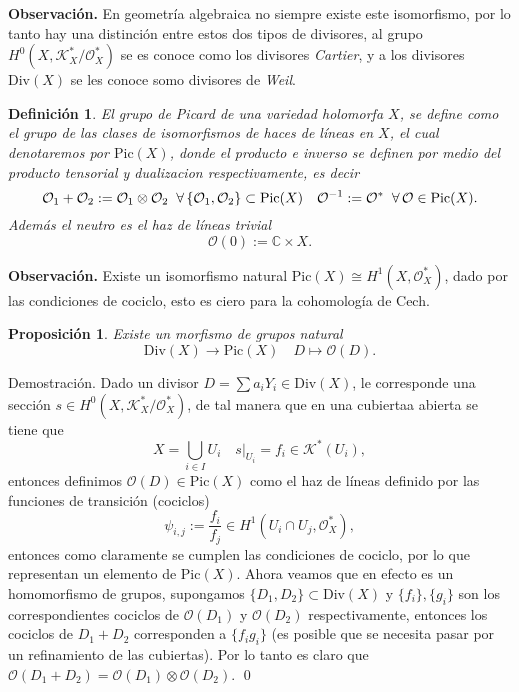 \documentclass[letterpaper]{article}
\newtheorem{prop}[teorema]{Proposici\'on}
\newtheorem{def.}{Definici\'on}[section]
\newcommand{\obs}{{\noindent \sc \textbf{Observación. }}}
\newcommand{\dem}{{\noindent \sc Demostraci\'on. }}
\newcommand{\co}{\ensuremath{\mathbb C }}
\newcommand{\lnb}{\ensuremath{\mathcal{O}}}
\newcommand{\Div}{\ensuremath{\mathrm{Div}}}
\begin{document}
\obs En geometría algebraica no siempre existe este isomorfismo, por lo tanto hay una distinción entre estos dos tipos de divisores, al grupo \(H^{0}(X,\mathcal{K}^{*}_{X}/\mathcal{O}^{*}_{X})\) se es conoce como los divisores \emph{Cartier}, y a los divisores \(\Div(X)\) se les conoce somo divisores de \emph{Weil}.
\begin{def.}
  El grupo de Picard de una variedad holomorfa \(X\), se define como el grupo de las clases de isomorfismos de haces de líneas en \(X\), el cual denotaremos por \(\mathrm{Pic}(X)\), donde el producto e inverso se definen por medio del producto tensorial y dualizacion respectivamente,  es decir
  \[
    \lnb_{1}+\lnb_{2}:=\lnb_{1}\otimes\lnb_{2}\hspace{0.2cm}\forall\,\{\lnb_{1},\lnb_{2}\}\subset\mathrm{Pic}(X)\quad\lnb^{-1}:=\lnb^{*}\hspace{0.2cm}\forall\,\lnb\in\mathrm{Pic}(X).
  \]
  \noindent Además el neutro es el \emph{haz de líneas trivial}
  \[
    \mathcal{O}(0):=\co\times X.
  \]
\end{def.}
\obs Existe un isomorfismo natural \(\mathrm{Pic}(X)\cong H^{1}(X,\mathcal{O}^{*}_{X})\), dado por las condiciones de cociclo, esto es ciero para la cohomología de Cech.
\begin{prop}
  Existe un morfismo de grupos natural
  \[
    \Div(X)\rightarrow\mathrm{Pic}(X)\quad D\mapsto \lnb(D).
  \]
\end{prop}
\dem Dado un divisor \(D=\sum a_{i}Y_{i}\in\Div(X)\), le corresponde una sección \(s\in H^{0}(X,\mathcal{K}^{*}_{X}/\mathcal{O}^{*}_{X})\), de tal manera que en una cubiertaa abierta se tiene que
\[
  X=\bigcup_{i\in I}U_{i}\quad s|_{U_{i}}=f_{i}\in\mathcal{K}^{*}(U_{i}),
\]
\noindent entonces definimos \(\lnb(D)\in\mathrm{Pic}(X)\) como el haz de líneas definido por las funciones de transición (cociclos)
\[
  \psi_{i,j}:=\frac{f_{i}}{f_{j}}\in H^{1}(U_{i}\cap U_{j},\mathcal{O}^{*}_{X}),
\]
\noindent entonces como claramente se cumplen las condiciones de cociclo, por lo que representan un elemento de \(\mathrm{Pic}(X)\). Ahora veamos que en efecto es un homomorfismo de grupos, supongamos \(\{D_{1},D_{2}\}\subset\Div(X)\) y \(\{f_{i}\},\{g_{i}\}\) son los correspondientes cociclos de \(\lnb(D_{1})\) y \(\lnb(D_{2})\) respectivamente, entonces los cociclos de \(D_{1}+D_{2}\) corresponden a \(\{f_{i}g_{i}\}\) (es posible que se necesita pasar por un refinamiento de las cubiertas). Por lo tanto es claro que \(\lnb(D_{1}+D_{2})=\lnb(D_{1})\otimes\lnb(D_{2})\). \qed
\end{document}
